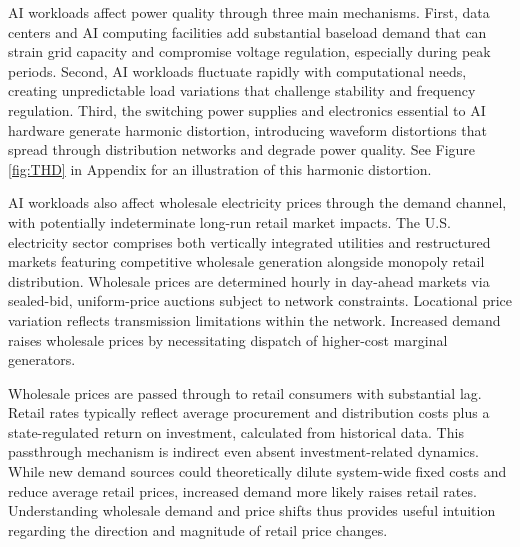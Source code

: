\documentclass[sigconf]{acmart}
\begin{document}
AI workloads affect power quality through three main mechanisms. First, data centers and AI computing facilities add substantial baseload demand that can strain grid capacity and compromise voltage regulation, especially during peak periods. Second, AI workloads fluctuate rapidly with computational needs, creating unpredictable load variations that challenge stability and frequency regulation. Third, the switching power supplies and electronics essential to AI hardware generate harmonic distortion, introducing waveform distortions that spread through distribution networks and degrade power quality. See Figure \ref{fig:THD} in Appendix for an illustration of this harmonic distortion.

AI workloads also affect wholesale electricity prices through the demand channel, with potentially indeterminate long-run retail market impacts. The U.S. electricity sector comprises both vertically integrated utilities and restructured markets featuring competitive wholesale generation alongside monopoly retail distribution. Wholesale prices are determined hourly in day-ahead markets via sealed-bid, uniform-price auctions subject to network constraints. Locational price variation reflects transmission limitations within the network. Increased demand raises wholesale prices by necessitating dispatch of higher-cost marginal generators.

Wholesale prices are passed through to retail consumers with substantial lag. Retail rates typically reflect average procurement and distribution costs plus a state-regulated return on investment, calculated from historical data. This passthrough mechanism is indirect even absent investment-related dynamics. While new demand sources could theoretically dilute system-wide fixed costs and reduce average retail prices, increased demand more likely raises retail rates. Understanding wholesale demand and price shifts thus provides useful intuition regarding the direction and magnitude of retail price changes.


\end{document}
